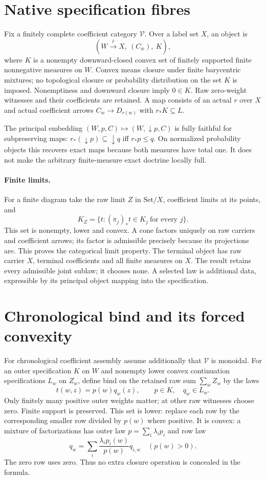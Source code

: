 \documentclass{article}
\begin{document}
\section{Native specification fibres}
Fix a finitely complete coefficient category $\mathcal V$. Over a label set $X$, an object is
\[(W\xrightarrow{\ell}X,\ (C_w),\ K),\]
where $K$ is a nonempty downward-closed convex set of finitely supported finite nonnegative measures on $W$. Convex means closure under finite barycentric mixtures; no topological closure or probability distribution on the set $K$ is imposed. Nonemptiness and downward closure imply $0\in K$. Raw zero-weight witnesses and their coefficients are retained. A map consists of an actual $r$ over $X$ and actual coefficient arrows $C_w\to D_{r(w)}$ with $r_*K\subseteq L$.

The principal embedding $(W,p,C)\mapsto(W,\downarrow p,C)$ is fully faithful for subpreserving maps: $r_*(\downarrow p)\subseteq\downarrow q$ iff $r_*p\le q$. On normalized probability objects this recovers exact maps because both measures have total one. It does not make the arbitrary finite-measure exact doctrine locally full.

\paragraph{Finite limits.} For a finite diagram take the raw limit $Z$ in $\mathrm{Set}/X$, coefficient limits at its points, and
\[K_Z=\{t:(\pi_j)_*t\in K_j\ \text{for every }j\}.\]
This set is nonempty, lower and convex. A cone factors uniquely on raw carriers and coefficient arrows; its factor is admissible precisely because its projections are. This proves the categorical limit property. The terminal object has raw carrier $X$, terminal coefficients and all finite measures on $X$. The result retains every admissible joint sublaw; it chooses none. A selected law is additional data, expressible by its principal object mapping into the specification.
\section{Chronological bind and its forced convexity}
For chronological coefficient assembly assume additionally that $\mathcal V$ is monoidal. For an outer specification $K$ on $W$ and nonempty lower convex continuation specifications $L_w$ on $Z_w$, define bind on the retained raw sum $\sum_w Z_w$ by the laws
\[t(w,z)=p(w)q_w(z),\qquad p\in K,\quad q_w\in L_w.\]
Only finitely many positive outer weights matter; at other raw witnesses choose zero. Finite support is preserved. This set is lower: replace each row by the corresponding smaller row divided by $p(w)$ where positive. It is convex: a mixture of factorizations has outer law $p=\sum_i\lambda_i p_i$ and row law
\[q_w=\sum_i\frac{\lambda_i p_i(w)}{p(w)}q_{i,w}\quad(p(w)>0).\]
The zero row uses zero. Thus no extra closure operation is concealed in the formula.
\end{document}
